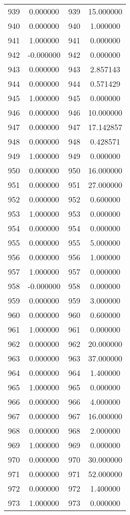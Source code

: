 \documentclass[12pt]{article}
\begin{document}
\begin{longtable}{@{}cccc@{}}
939 & 0.000000 & 939 & 15.000000 \\
940 & 0.000000 & 940 & 1.000000 \\
941 & 1.000000 & 941 & 0.000000 \\
942 & -0.000000 & 942 & 0.000000 \\
943 & 0.000000 & 943 & 2.857143 \\
944 & 0.000000 & 944 & 0.571429 \\
945 & 1.000000 & 945 & 0.000000 \\
946 & 0.000000 & 946 & 10.000000 \\
947 & 0.000000 & 947 & 17.142857 \\
948 & 0.000000 & 948 & 0.428571 \\
949 & 1.000000 & 949 & 0.000000 \\
950 & 0.000000 & 950 & 16.000000 \\
951 & 0.000000 & 951 & 27.000000 \\
952 & 0.000000 & 952 & 0.600000 \\
953 & 1.000000 & 953 & 0.000000 \\
954 & 0.000000 & 954 & 0.000000 \\
955 & 0.000000 & 955 & 5.000000 \\
956 & 0.000000 & 956 & 1.000000 \\
957 & 1.000000 & 957 & 0.000000 \\
958 & -0.000000 & 958 & 0.000000 \\
959 & 0.000000 & 959 & 3.000000 \\
960 & 0.000000 & 960 & 0.600000 \\
961 & 1.000000 & 961 & 0.000000 \\
962 & 0.000000 & 962 & 20.000000 \\
963 & 0.000000 & 963 & 37.000000 \\
964 & 0.000000 & 964 & 1.400000 \\
965 & 1.000000 & 965 & 0.000000 \\
966 & 0.000000 & 966 & 4.000000 \\
967 & 0.000000 & 967 & 16.000000 \\
968 & 0.000000 & 968 & 2.000000 \\
969 & 1.000000 & 969 & 0.000000 \\
970 & 0.000000 & 970 & 30.000000 \\
971 & 0.000000 & 971 & 52.000000 \\
972 & 0.000000 & 972 & 1.400000 \\
973 & 1.000000 & 973 & 0.000000 \\

\end{longtable}
\end{document}
